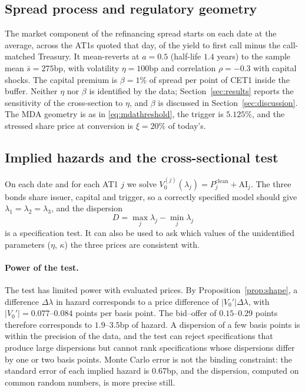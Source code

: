 \subsection{Spread process and regulatory geometry}

The market component of the refinancing spread starts on each date at the average, across
the AT1s quoted that day, of the yield to first call minus the call-matched Treasury. It
mean-reverts at $a=0.5$ (half-life $1.4$ years) to the sample mean $\bar s=275$bp, with
volatility $\eta=100$bp and correlation $\rho=-0.3$ with capital shocks. The capital premium
is $\beta=1\%$ of spread per point of CET1 inside the buffer. Neither $\eta$ nor $\beta$
is identified by the data; Section~\ref{sec:results} reports the sensitivity of the
cross-section to $\eta$, and $\beta$ is discussed in Section~\ref{sec:discussion}. The MDA
geometry is as in \eqref{eq:mdathreshold}, the trigger is $5.125\%$, and the stressed share
price at conversion is $\xi=20\%$ of today's.

\subsection{Implied hazards and the cross-sectional test}

On each date and for each AT1 $j$ we solve $V^{(j)}_0(\lambda_j)=P_j^{\mathrm{clean}}+\mathrm{AI}_j$.
The three bonds share issuer, capital and trigger, so a correctly specified model should
give $\lambda_1=\lambda_2=\lambda_3$, and the dispersion
\[
  D=\max_j\lambda_j-\min_j\lambda_j
\]
is a specification test. It can also be used to ask which values of the unidentified
parameters ($\eta$, $\kappa$) the three prices are consistent with.

\paragraph{Power of the test.} The test has limited power with evaluated prices. By
Proposition~\ref{prop:shape}, a difference $\Delta\lambda$ in hazard corresponds to a price
difference of $|V_0'|\Delta\lambda$, with $|V_0'|=0.077$--$0.084$ points per basis point. The
bid--offer of $0.15$--$0.29$ points therefore corresponds to $1.9$--$3.5$bp of hazard. A
dispersion of a few basis points is within the precision of the data, and the test can
reject specifications that produce large dispersions but cannot rank specifications whose
dispersions differ by one or two basis points. Monte Carlo error is not the binding
constraint: the standard error of each implied hazard is $0.67$bp, and the dispersion,
computed on common random numbers, is more precise still.

